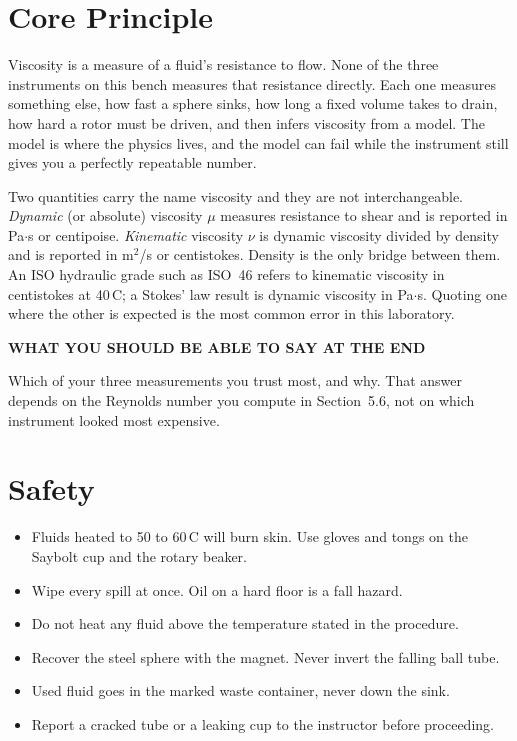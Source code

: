 \documentclass[11pt,a4paper]{article}
\newcommand{\noteh}[1]{{\footnotesize\bfseries\sffamily\color{ink3}\MakeUppercase{#1}}\par\vspace{2pt}}
\begin{document}
\section{Core Principle}
Viscosity is a measure of a fluid's resistance to flow. None of the three instruments on this
bench measures that resistance directly. Each one measures something else, how fast a sphere
sinks, how long a fixed volume takes to drain, how hard a rotor must be driven, and then infers
viscosity from a model. The model is where the physics lives, and the model can fail while the
instrument still gives you a perfectly repeatable number.

Two quantities carry the name viscosity and they are not interchangeable. \emph{Dynamic} (or
absolute) viscosity $\mu$ measures resistance to shear and is reported in Pa$\cdot$s or
centipoise. \emph{Kinematic} viscosity $\nu$ is dynamic viscosity divided by density and is
reported in m$^2$/s or centistokes. Density is the only bridge between them. An ISO hydraulic
grade such as ISO~46 refers to kinematic viscosity in centistokes at 40\,\textdegree C; a
Stokes' law result is dynamic viscosity in Pa$\cdot$s. Quoting one where the other is expected
is the most common error in this laboratory.

\begin{labnote}
\noteh{What you should be able to say at the end}
Which of your three measurements you trust most, and why. That answer depends on the Reynolds
number you compute in Section~5.6, not on which instrument looked most expensive.
\end{labnote}

\section{Safety}
\begin{itemize}
  \item Fluids heated to 50 to 60\,\textdegree C will burn skin. Use gloves and tongs on the
        Saybolt cup and the rotary beaker.
  \item Wipe every spill at once. Oil on a hard floor is a fall hazard.
  \item Do not heat any fluid above the temperature stated in the procedure.
  \item Recover the steel sphere with the magnet. Never invert the falling ball tube.
  \item Used fluid goes in the marked waste container, never down the sink.
  \item Report a cracked tube or a leaking cup to the instructor before proceeding.
\end{itemize}
\end{document}
